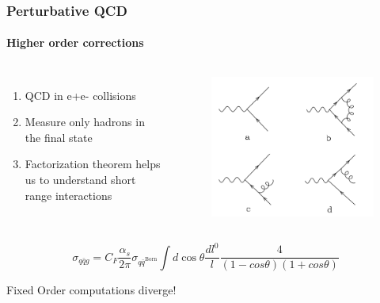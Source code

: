 \documentclass[aspectratio=43]{beamer}
\begin{document}
\begin{frame}

	\frametitle{Perturbative QCD}
	\framesubtitle{Higher order corrections}
	\begin{columns}
	
	
	\begin{enumerate}
		\item QCD in e+e- collisions
		\item Measure only hadrons in the final state
		\item Factorization theorem helps us to understand short range interactions
	\end{enumerate}
	
	\begin{figure}[!htb]
		\includegraphics[width = \linewidth]{plots/qcd_corrections.png}
	\end{figure}
	
\end{columns}

\begin{equation}
	\sigma_{q\bar{q}g} = C_{F} \frac{\alpha_{s}}{2\pi} \sigma_{q\bar{q}^{\textrm{Born}}} \int d\cos\theta \frac{dl^{0}}{l} \frac{4}{(1 - cos\theta)(1 + cos\theta)} \nonumber
\end{equation}

	Fixed Order computations diverge!

\end{frame}
\end{document}
